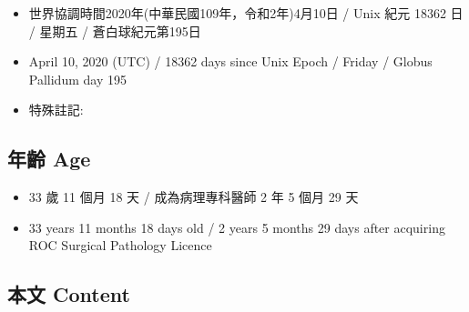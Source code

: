 \documentclass[a5paper, 11pt
]{book}
\providecommand{\tightlist}{%
  \setlength{\itemsep}{0pt}\setlength{\parskip}{0pt}}
\begin{document}
\begin{itemize}
\tightlist
\item
  世界協調時間2020年(中華民國109年，令和2年)4月10日 / Unix 紀元 18362 日
  / 星期五 / 蒼白球紀元第195日
\item
  April 10, 2020 (UTC) / 18362 days since Unix Epoch / Friday / Globus
  Pallidum day 195
\item
  特殊註記:
\end{itemize}

\hypertarget{ux5e74ux9f61-age-40}{%
\subsection{年齡 Age}\label{ux5e74ux9f61-age-40}}

\begin{itemize}
\tightlist
\item
  33 歲 11 個月 18 天 / 成為病理專科醫師 2 年 5 個月 29 天
\item
  33 years 11 months 18 days old / 2 years 5 months 29 days after
  acquiring ROC Surgical Pathology Licence
\end{itemize}

\hypertarget{ux672cux6587-content-40}{%
\subsection{本文 Content}\label{ux672cux6587-content-40}}
\end{document}
